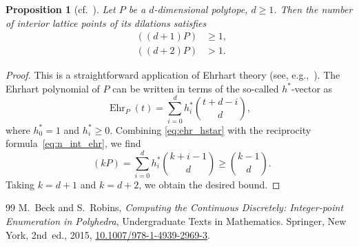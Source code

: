 \documentclass[10pt,a4paper]{amsart}
\newtheorem{proposition}{Proposition}
\DeclareMathOperator{\ehr}{Ehr}
\DeclareMathOperator{\nint}{N_{\mathrm{int}}}
\begin{document}
\begin{proposition}[cf.~{\cite[Exercise 4.10]{Beck:2015}}]
	Let \(P\) be a \(d\)-dimensional polytope, \(d \geq 1\). Then the number of interior lattice points of its dilations satisfies
	\begin{equation}
		\begin{aligned}
			\nint((d+1)P) & \geq 1, \\
			\nint((d+2)P) & > 1.
		\end{aligned}
	\end{equation}
\end{proposition}

\begin{proof}
	This is a straightforward application of Ehrhart theory (see, e.g.,~\cite[Chapters 3 and 4]{Beck:2015}). The Ehrhart polynomial of \(P\) can be written in terms of the so-called \(h^*\)-vector as
	\begin{equation}
		\ehr_P(t) = \sum_{i=0}^d h_i^* \binom{t+d-i}{d},
		\label{eq:ehr_hstar}
	\end{equation}
	where \(h_0^* = 1\) and \(h_i^* \geq 0\). Combining \cref{eq:ehr_hstar} with the reciprocity formula~\eqref{eq:n_int_ehr}, we find
	\begin{equation}
		\nint(kP) = \sum_{i=0}^d h_i^* \binom{k+i-1}{d} \geq \binom{k-1}{d}. 
	\end{equation}
	Taking \(k=d+1\) and \(k=d+2\), we obtain the desired bound.
\end{proof}

\begin{thebibliography}{99}
 M.~Beck and S.~Robins, \emph{Computing the Continuous Discretely: Integer-point Enumeration in Polyhedra}, Undergraduate Texts in Mathematics. Springer, New York, 2nd~ed., 2015, \href{https://doi.org/10.1007/978-1-4939-2969-3}{10.1007/978-1-4939-2969-3}.
\end{thebibliography}
\end{document}
